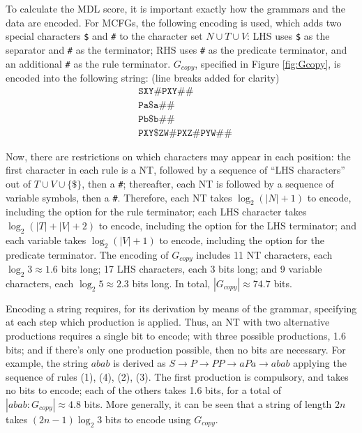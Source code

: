 \documentclass{article}
\begin{document}
To calculate the MDL score, it is important exactly how the grammars and the data are encoded.
For MCFGs, the following encoding is used, which adds two special characters \texttt{\$} and \texttt{\#}
to the character set $N\cup T\cup V$: 
LHS uses \texttt{\$} as the separator and \texttt{\#} as the terminator;
RHS uses \texttt{\#} as the predicate terminator, and an additional \texttt{\#} as the rule terminator.
$G_{copy}$, specified in Figure \ref{fig:Gcopy}, is encoded into the following string: (line breaks added for clarity)
\begin{align*}
&\texttt{SXY\#PXY\#\#}\\
&\texttt{Pa\$a\#\#}\\
&\texttt{Pb\$b\#\#}\\
&\texttt{PXY\$ZW\#PXZ\#PYW\#\#}
\end{align*}

Now, there are restrictions on which characters may appear in each position:
the first character in each rule is a NT,
followed by a sequence of ``LHS characters'' out of $T\cup V\cup \{\texttt{\$}\}$, then a \texttt{\#};
thereafter, each NT is followed by a sequence of variable symbols, then a \texttt{\#}.
Therefore, each NT takes $\log_2(|N|+1)$ to encode, including the option for the rule terminator;
each LHS character takes $\log_2(|T|+|V|+2)$ to encode, including the option for the LHS terminator;
and each variable takes $\log_2(|V|+1)$ to encode, including the option for the predicate terminator.
The encoding of $G_{copy}$ includes 11 NT characters, each $\log_2 3\approx1.6$ bits long;
17 LHS characters, each 3 bits long; and 9 variable characters, each $\log_2 5\approx2.3$ bits long.
In total, $|G_{copy}|\approx74.7$ bits.

Encoding a string requires, for its derivation by means of the grammar,
specifying at each step which production is applied.
Thus, an NT with two alternative productions requires a single bit to encode; with three possible
productions, 1.6 bits; and if there's only one production possible, then no bits are necessary.
For example, the string $abab$ is derived as $S\rightarrow P\rightarrow PP \rightarrow aPa \rightarrow abab$ applying the sequence of rules (1), (4), (2), (3).
The first production is compulsory, and takes no bits to encode; each of the others takes 1.6 bits,
for a total of $|abab:G_{copy}|\approx4.8$ bits.
More generally, it can be seen that a string of length $2n$ takes $(2n-1)\log_2 3$ bits
to encode using $G_{copy}$.
\end{document}
